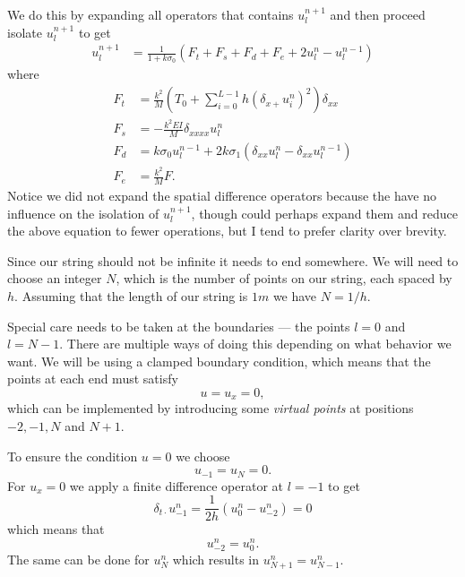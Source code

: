 \documentclass{article}
\begin{document}
We do this by expanding all operators that contains $u^{n+1}_l$ and then proceed isolate $u^{n+1}_l$ to get
\begin{align}
  \label{eq:stringUpdate}
  u^{n+1}_l &= \frac{1}{1 + k\sigma_0} (F_t + F_s + F_d + F_e + 2u^n_l - u^{n-1}_l)
\end{align}
where
\begin{align}
  F_t &= \frac{k^2}{M} \left(T_0 + \sum^{L-1}_{i=0} h(\delta_{x+} u^n_i)^2 \right)\delta_{xx} \\
  F_s &= -\frac{k^2 E I}{M} \delta_{xxxx} u^n_l\\
  F_d &= k\sigma_0u^{n-1}_l + 2k\sigma_1 (\delta_{xx}u^n_l - \delta_{xx}u^{n-1}_l)\\
  F_e &= \frac{k^2}{M}F.
\end{align}
Notice we did not expand the spatial difference operators because the have no influence on the isolation of $u^{n+1}_l$, though could perhaps expand them and reduce the above equation to fewer operations, but I tend to prefer clarity over brevity.

Since our string should not be infinite it needs to end somewhere.
We will need to choose an integer $N$, which is the number of points on our string, each spaced by $h$.
Assuming that the length of our string is $1m$ we have $N = 1 / h$.

Special care needs to be taken at the boundaries --- the points $l=0$ and $l=N-1$.
There are multiple ways of doing this depending on what behavior we want.
We will be using a clamped boundary condition, which means that the points at each end must satisfy\cite[Chapter~7]{bilbao_numerical_2009}
\begin{equation}
  u = u_x = 0,
\end{equation}
which can be implemented by introducing some \textit{virtual points} at positions $-2, -1, N$ and $N+1$.

To ensure the condition $u = 0$ we choose
\begin{equation}
  u_{-1} = u_{N} = 0.
\end{equation}
For $u_x = 0$ we apply a finite difference operator at $l = -1$ to get
\begin{equation}
  \delta_{t\cdot} u^n_{-1} = \frac{1}{2h}(u^n_0 - u^n_{-2}) = 0
\end{equation}
which means that
\begin{equation}
  u^n_{-2} = u^n_0.
\end{equation}
The same can be done for $u^n_N$ which results in $u^n_{N+1} = u^n_{N-1}$.
\end{document}
